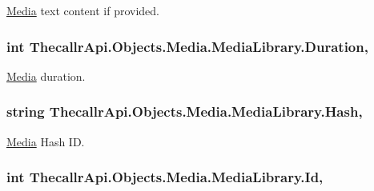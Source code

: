 \hyperlink{namespace_thecallr_api_1_1_objects_1_1_media}{Media} text content if provided. 

\hypertarget{class_thecallr_api_1_1_objects_1_1_media_1_1_media_library_a9a4b62eb05010a5b2e277a17ff51eeb8}{
\subsubsection[{Duration}]{\setlength{\rightskip}{0pt plus 5cm}int Thecallr\+Api.\+Objects.\+Media.\+Media\+Library.\+Duration\hspace{0.3cm}{\ttfamily [get]}, {\ttfamily [set]}}}\label{class_thecallr_api_1_1_objects_1_1_media_1_1_media_library_a9a4b62eb05010a5b2e277a17ff51eeb8}


\hyperlink{namespace_thecallr_api_1_1_objects_1_1_media}{Media} duration. 

\hypertarget{class_thecallr_api_1_1_objects_1_1_media_1_1_media_library_a4d9c7a546db06d691af374470e7a83be}{
\subsubsection[{Hash}]{\setlength{\rightskip}{0pt plus 5cm}string Thecallr\+Api.\+Objects.\+Media.\+Media\+Library.\+Hash\hspace{0.3cm}{\ttfamily [get]}, {\ttfamily [set]}}}\label{class_thecallr_api_1_1_objects_1_1_media_1_1_media_library_a4d9c7a546db06d691af374470e7a83be}


\hyperlink{namespace_thecallr_api_1_1_objects_1_1_media}{Media} Hash I\+D. 

\hypertarget{class_thecallr_api_1_1_objects_1_1_media_1_1_media_library_a96225807000e05b1ba6726a8b8f4617e}{
\subsubsection[{Id}]{\setlength{\rightskip}{0pt plus 5cm}int Thecallr\+Api.\+Objects.\+Media.\+Media\+Library.\+Id\hspace{0.3cm}{\ttfamily [get]}, {\ttfamily [set]}}}\label{class_thecallr_api_1_1_objects_1_1_media_1_1_media_library_a96225807000e05b1ba6726a8b8f4617e}


